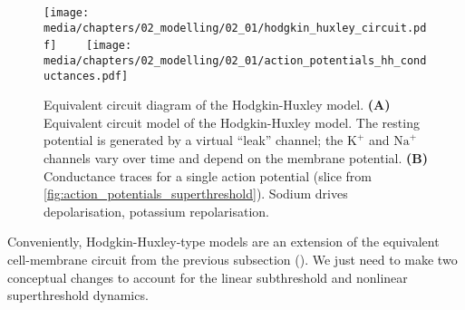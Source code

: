 \begin{figure}[p]
	\vspace{0.5cm}
	\texttt{[image: media/chapters/02\_modelling/02\_01/hodgkin\_huxley\_circuit.pdf]}~~~~%
	\texttt{[image: media/chapters/02\_modelling/02\_01/action\_potentials\_hh\_conductances.pdf]}
	{\label{fig:action_potentials_hh_conductances_circuit}}
	{\label{fig:action_potentials_hh_conductances_conductances}}
	\vspace{-0.5cm}
	\caption[Equivalent circuit diagram of the Hodgkin-Huxley model]{Equivalent circuit diagram of the Hodgkin-Huxley model. \textbf{(A)} Equivalent circuit model of the Hodgkin-Huxley model. The resting potential is generated by a virtual \enquote{leak} channel; the $\mathrm{K}^+$ and $\mathrm{Na}^+$ channels vary over time and depend on the membrane potential. \textbf{(B)} Conductance traces for a single action potential (slice from \cref{fig:action_potentials_superthreshold}). Sodium drives depolarisation, potassium repolarisation.}
	\label{fig:action_potentials_hh_conductances}
\end{figure}

Conveniently, Hodgkin-Huxley-type models are an extension of the equivalent cell-membrane circuit from the previous subsection ().
We just need to make two conceptual changes to account for the linear subthreshold and nonlinear superthreshold dynamics.

